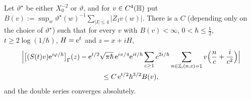 \begin{lemma}\label{cl:asym}
Let $\vartheta^\star$ be either $X_0^{-2}$ or $\vartheta$, and for $v\in C^4(\mathbb{H})$ put
$B(v):=\sup_w\vartheta^\star(w)^{-1}\sum_{|I|\le4}|Z_Iv(w)|$. There is a $C$ (depending only on the choice of $\vartheta^\star$) such that for every $v$ with
$B(v)<\infty$, $0<\hbar\le\tfrac12$,
$t\ge2\log(1/\hbar)$, $H=\mathrm{e}^t$ and $z=x+iH$,
\begin{multline*}
\Bigl|\bigl[(S(t)v)\mathrm{e}^{i\varphi/\hbar}\bigr]_\Gamma(z)-\mathrm{e}^{t/2}\sqrt{\pi\hbar}\,\mathrm{e}^{i\pi/4}\mathrm{e}^{it/\hbar}\sum_{c\ge1}c^{2i/\hbar}\sum_{n\in\mathbb Z,(n,c)=1}v\Bigl(\frac nc+\frac i{c^2}\Bigr)\Bigr|\\
\le C\,\mathrm{e}^{t/2}\hbar^{3/2}B(v),
\end{multline*}
and the double series converges absolutely.
\end{lemma}
